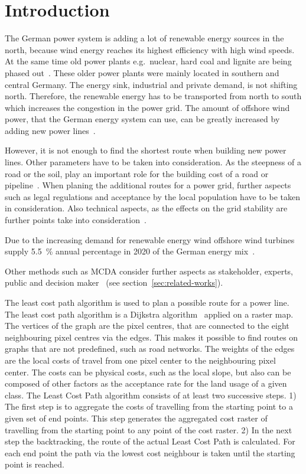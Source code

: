 \documentclass[acmtog]{acmart}
\begin{document}
	\section{Introduction}\label{sec:introduction}

	The German power system is adding a lot of renewable energy sources in the north, because wind energy reaches its highest efficiency with high wind speeds.
	At the same time old power plants e.g.\ nuclear, hard coal and lignite are being phased out~\cite{eser-frey_analyzing_2012}.
	These older power plants were mainly located in southern and central Germany. 
	The energy sink,  industrial and private demand, is not shifting north.
	Therefore, the renewable energy has to be transported from north to south which increases the congestion in the power grid. 
	The amount of offshore wind power, that the German energy system can use, can be greatly increased by adding new power lines~\cite{leuthold_nodal_2005}.
	
	However, it is not enough to find the shortest route when building new power lines.
	Other parameters have to be taken into consideration.
	As the steepness of a road or the soil, play an important role for the building cost of a road or pipeline~\cite{suleiman_optimal_2015}.
	When planing the additional routes for a power grid, further aspects such as legal regulations and acceptance
	by the local population have to be taken in consideration.
	Also technical aspects, as the effects on the grid stability are further points take into consideration~\cite{schafer_understanding_2022}.
	
	Due to the increasing demand for renewable energy wind offshore wind turbines supply 5.5~\% annual percentage in 2020 of the German energy mix~\cite{noauthor_nettostromerzeugung_2021}.

	Other methods such as \acrfull{MCDA} consider further aspects as stakeholder, experts, public and decision maker~\cite{bertsch_participatory_2016} (see section~\ref{sec:related-works}).
	
	The least cost path algorithm is used to plan a possible route for a power line.
	The least cost path algorithm is a Dijkstra algorithm~\cite{dijkstra_note_1959} applied on a raster map.
	The vertices of the graph are the pixel centres, that are connected to the eight neighbouring pixel centres via the edges.
	This makes it possible to find routes on graphs that are not predefined, such as road networks.
	The weights of the edges are the local costs of travel from one pixel center to the neighbouring pixel center.
	The costs can be physical costs, such as the local slope, but also can be composed of other factors as the acceptance rate for the land usage of a given class.
	The Least Cost Path algorithm consists of at least two successive steps.
	1) The first step is to aggregate the costs of travelling from the starting point to a given set of end points.
	This step generates the aggregated cost raster of travelling from the starting point to any point of the cost raster.
	2) In the next step the backtracking, the route of the actual Least Cost Path is calculated.
	For each end point the path via the lowest cost neighbour is taken until the starting point is reached.
	
\end{document}
